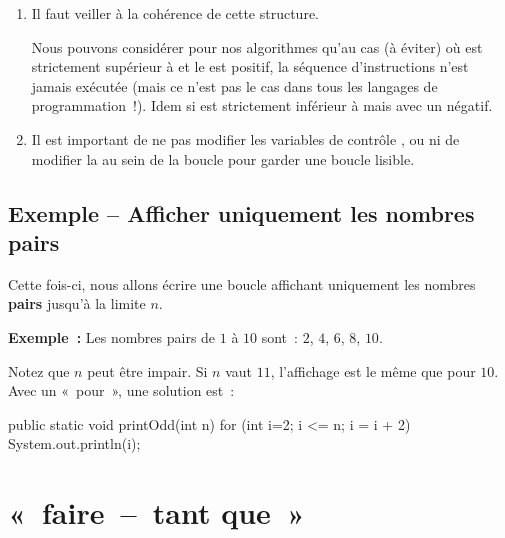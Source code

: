 	\begin{enumerate}
	
		\item Il faut veiller à la cohérence de cette structure. 
		
			Nous pouvons considérer pour nos algorithmes qu’au cas (à éviter) où
			 est strictement supérieur à  et le  est
			positif, la séquence d’instructions n’est jamais exécutée (mais ce
			n’est pas le cas dans tous les langages de programmation~!). Idem si
			 est strictement inférieur à  mais avec un
			 négatif.


		\item Il est important de ne pas modifier les variables de contrôle
			,  ou  ni de modifier la  au
			sein de la boucle pour garder une boucle lisible.

	\end{enumerate}

		
	
		
	
	\subsection{Exemple -- Afficher uniquement les nombres pairs}

		Cette fois-ci, nous allons écrire une boucle affichant uniquement 
		les nombres \textbf{pairs} jusqu’à la limite $n$.
		
		\textbf{Exemple~:}
		Les nombres pairs de $1$ à $10$ sont~: $2$, $4$, $6$, $8$, $10$.
		
		Notez que $n$ peut être impair. 
		Si $n$ vaut $11$, l’affichage est le même que pour $10$.
		Avec un «~pour~», une solution est~:


		\begin{java}
public static void printOdd(int n){
	for (int i=2; i <= n; i = i + 2){
		System.out.println(i);
	}
}
		\end{java}



		
		
		
\pagebreak[4]
\section{«~faire~–~tant que~»}

